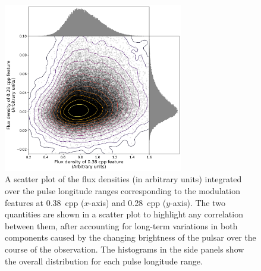 \begin{figure}
    \begin{center}
        \includegraphics[width=0.7\textwidth]{Figures/J1518/energy_scatter.png}
        \caption[Profile component flux density comparison]{A scatter plot of the flux densities (in arbitrary units) integrated over the pulse longitude ranges corresponding to the modulation features at 0.38~cpp ($x$-axis) and 0.28~cpp ($y$-axis). The two quantities are shown in a scatter plot to highlight any correlation between them, after accounting for long-term variations in both components caused by the changing brightness of the pulsar over the course of the observation. The histograms in the side panels show the overall distribution for each pulse longitude range.}
        \label{fig: J1518 - energy scatter plots}
    \end{center}
\end{figure}

